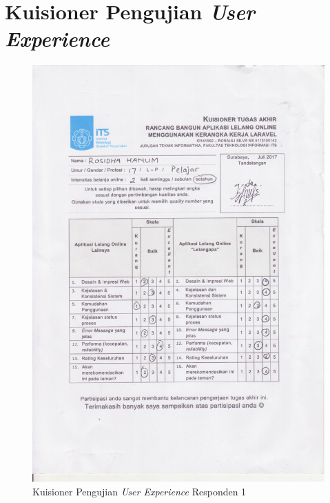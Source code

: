 \chapter{Kuisioner Pengujian \textit{User Experience}}
\begin{figure}[H]
	\centering
	\includegraphics[width=.9\textwidth]{images/bab5/ujipengguna/1.jpg}
	\caption{Kuisioner Pengujian \textit{User Experience} Responden 1}
	\label{quest-1}
\end{figure}
